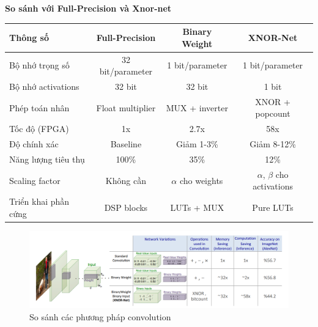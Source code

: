 \textbf{So sánh với Full-Precision và Xnor-net}
\begin{table}[h]
    \centering
    \begin{tabular}{|l|c|c|c|}
    \hline
    \textbf{Thông số} & \textbf{Full-Precision} & \textbf{Binary Weight} & \textbf{XNOR-Net} \\ \hline
    Bộ nhớ trọng số & 32 bit/parameter & 1 bit/parameter & 1 bit/parameter \\ \hline
    Bộ nhớ activations & 32 bit & 32 bit & 1 bit \\ \hline
    Phép toán nhân & Float multiplier & MUX + inverter & XNOR + popcount \\ \hline
    Tốc độ (FPGA) & 1x & 2.7x & 58x \\ \hline
    Độ chính xác & Baseline & Giảm 1-3\% & Giảm 8-12\% \\ \hline
    Năng lượng tiêu thụ & 100\% & 35\% & 12\% \\ \hline
    Scaling factor & Không cần & $\alpha$ cho weights & $\alpha$, $\beta$ cho activations \\ \hline
    Triển khai phần cứng & DSP blocks & LUTs + MUX & Pure LUTs \\ \hline
    \end{tabular}
\end{table}
\begin{figure}[H]
    \centering
    \includegraphics[width=0.9\linewidth]{Images/comparebinaryw.png}
    \caption{So sánh các phương pháp convolution}
    \label{fig:enter-label}
\end{figure}

